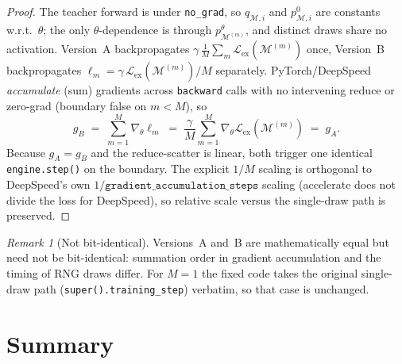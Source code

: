 \documentclass{article}
\newcommand{\Mset}{\mathcal M}
\newcommand{\Lex}{\mathcal L_{\mathrm{ex}}}
\theoremstyle{plain}
\theoremstyle{remark}
\newtheorem{remark}{Remark}
\begin{document}
\begin{proof}
The teacher forward is under \texttt{no\_grad}, so $q_{\Mset,i}$ and
$p^0_{\Mset,i}$ are constants w.r.t.\ $\theta$; the only $\theta$-dependence is
through $p^\theta_{\Mset^{(m)}}$, and distinct draws share no activation.
Version~A backpropagates $\gamma\,\tfrac{1}{M}\sum_m\Lex(\Mset^{(m)})$ once,
Version~B backpropagates $\ell_m=\gamma\,\Lex(\Mset^{(m)})/M$ separately.
PyTorch/DeepSpeed \emph{accumulate} (sum) gradients across \texttt{backward}
calls with no intervening reduce or zero-grad (boundary false on $m<M$), so
\begin{equation*}
  g_B \;=\; \sum_{m=1}^{M}\nabla_\theta\ell_m
     \;=\; \frac{\gamma}{M}\sum_{m=1}^{M}\nabla_\theta\Lex(\Mset^{(m)})
     \;=\; g_A .
\end{equation*}
Because $g_A=g_B$ and the reduce-scatter is linear, both trigger one identical
\texttt{engine.step()} on the boundary. The explicit $1/M$ scaling is orthogonal
to DeepSpeed's own $1/\texttt{gradient\_accumulation\_steps}$ scaling (accelerate
does not divide the loss for DeepSpeed), so relative scale versus the single-draw
path is preserved.
\end{proof}

\begin{remark}[Not bit-identical]
Versions~A and~B are mathematically equal but need not be bit-identical:
summation order in gradient accumulation and the timing of RNG draws differ.
For $M=1$ the fixed code takes the original single-draw path
(\texttt{super().training\_step}) verbatim, so that case is unchanged.
\end{remark}

\section{Summary}
\end{document}
